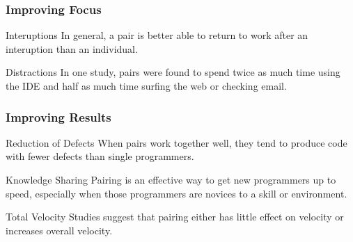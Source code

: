 \begin{frame}
  \frametitle{Improving Focus}
  \begin{block}{Interuptions}
  In general, a pair is better able to return to work after an interuption than an individual\cite{6227110}. 
  \end{block} 
  \begin{block}{Distractions}
  In one study, pairs were found to spend twice as much time using the IDE and half as much time surfing the web or checking email\cite{854064}.
  \end{block}
\end{frame}

\begin{frame}
  \frametitle{Improving Results}
  \begin{block}{Reduction of Defects}
  When pairs work together well, they tend to produce code with fewer defects than single programmers\cite{Canfora20071317}.
  \end{block} 
  \begin{block}{Knowledge Sharing}
  Pairing is an effective way to get new programmers up to speed, especially when those programmers are novices to a skill or environment\cite{5315998}.
  \end{block}
  \begin{block}{Total Velocity}
  Studies suggest that pairing either has little effect on velocity or increases overall velocity\cite{1553595}.
  \end{block}
\end{frame}

